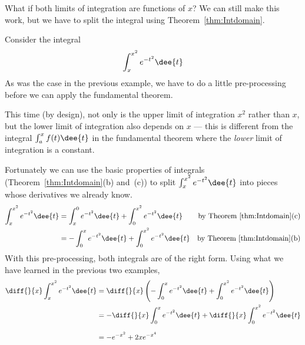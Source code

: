What if both limits of integration are functions of $x$? We can still make this
work, but we have to split the integral using Theorem~\ref{thm:Intdomain}.
\begin{eg}\label{eg:INTftocC}
Consider the integral
\begin{align*}
  \int_x^{x^2} e^{-t^2}\dee{t}
\end{align*}
As was the case in the previous example, we have to do a little pre-processing
before we can apply the fundamental theorem.

This time (by design), not only is the upper limit of integration $x^2$ rather
than $x$, but the lower limit of integration also depends on $x$ --- this is
different from the integral $\int_a^x f(t)\dee{t}$ in the fundamental theorem
where the \emph{lower} limit of integration is a constant.

Fortunately we can use the basic properties of integrals
(Theorem~\ref{thm:Intdomain}(b) and~(c)) to split $\int_x^{x^2} e^{-t^2}\dee{t}$
into pieces whose derivatives we already know.
\begin{align*}
\int_x^{x^2} e^{-t^2}\dee{t}
&=\int_x^0 e^{-t^2}\dee{t}+\int_0^{x^2} e^{-t^2}\dee{t}
&\text{by Theorem~\ref{thm:Intdomain}(c)}\\
&=-\int^x_0 e^{-t^2}\dee{t}+\int_0^{x^2} e^{-t^2}\dee{t}
&\text{by Theorem~\ref{thm:Intdomain}(b)}
\end{align*}
With this pre-processing, both integrals are of the right form. Using what
we have learned in the previous two examples,
\begin{align*}
\diff{}{x}\int_x^{x^2} e^{-t^2}\dee{t}
&=\diff{}{x}\left(
 -\int_0^{x} e^{-t^2}\dee{t} + \int_0^{x^2} e^{-t^2}\dee{t}
\right)\\
&=-\diff{}{x}\int^x_0 e^{-t^2}\dee{t}
+\diff{}{x}\int_0^{x^2} e^{-t^2}\dee{t}
\\[0.1in]
&=- e^{-x^2} +2x e^{-x^4}
\end{align*}
\end{eg}

